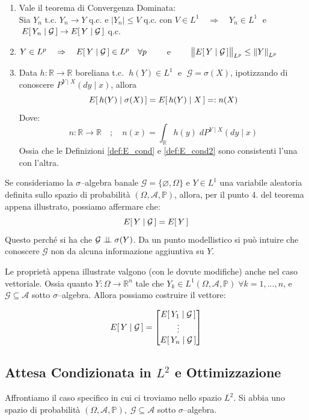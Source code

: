 \begin{teorema}
\begin{enumerate}[start=0]
        \item Vale il teorema di Convergenza Dominata:\\
        Sia $Y_n$ t.c. $Y_n\to Y$ q.c. e $|Y_n|\leq V$ q.c. con $V\in L^1\quad \Rightarrow\quad Y_n\in L^1\;$ e $\; E\!\left[\,Y_n\mid \mathcal{G}\,\right]\to E\!\left[\,Y\mid \mathcal{G}\,\right]$ q.c.

        \item $Y\in L^p \quad \Rightarrow\quad E\!\left[\,Y\mid \mathcal{G}\,\right]\in L^p\quad \forall p\qquad$ e $\qquad \bigl\|E\!\left[\,Y\mid \mathcal{G}\,\right]\bigr\|_{L^p} \leq \left\|Y\right\|_{L^p}$

        \item Data $h:\mathbb{R}\to \mathbb{R}$ boreliana t.c. $\;h(Y)\in L^1\;$ e $\; \mathcal{G} = \sigma(X)$, ipotizzando di conoscere $P^{Y\mid X}(dy\mid x)$, allora
        \[E\!\left[\,h(Y)\mid \sigma(X)\,\right] = E\!\left[\,h(Y)\mid X\,\right] =:n(X)\]
        Dove:
        \[n:\mathbb{R}\to\mathbb{R}\quad ;\quad n(x) = \int_\mathbb{R}h(y)\;dP^{Y\mid X}(dy\mid x)\]
        Ossia che le Definizioni \ref{def:E_cond} e \ref{def:E_cond2} sono consistenti l'una con l'altra.
    \end{enumerate}
\end{teorema}

Se consideriamo la $\sigma$--algebra banale $\mathcal{G} = \{\varnothing, \Omega\}$ e $Y\in L^1$ una variabile aleatoria definita sullo spazio di probabilità $(\Omega, \mathcal{A},\mathbb{P})$, allora, per il punto 4. del teorema appena illustrato, possiamo affermare che:
\[E\!\left[\,Y\mid \mathcal{G}\,\right] = E\!\left[\,Y\,\right]\]
Questo perché si ha che $\mathcal{G}\mathrel{\perp\!\!\!\perp} \sigma(Y)$. Da un punto modellistico si può intuire che conoscere $\mathcal{G}$ non da alcuna informazione aggiuntiva su $Y$.

\bigskip
\noindent Le proprietà appena illustrate valgono (con le dovute modifiche) anche nel caso vettoriale. Ossia quanto $Y:\Omega\to \mathbb{R}^n$ tale che $Y_k\in L^1(\Omega, \mathcal{A},\mathbb{P})\;\forall k = 1, ..., n$, e $\mathcal{G}\subseteq\mathcal{A}$ sotto $\sigma$--algebra. Allora possiamo costruire il vettore:

\[E\!\left[\,Y\mid \mathcal{G}\,\right] = \begin{bmatrix}E\!\left[\,Y_1\mid \mathcal{G}\,\right]\\ \vdots\\ E\!\left[\,Y_n\mid \mathcal{G}\,\right]\end{bmatrix}\]

\subsection{Attesa Condizionata in $L^2$ e Ottimizzazione}
Affrontiamo il caso specifico in cui ci troviamo nello spazio $L^2$. Si abbia uno spazio di probabilità $(\Omega, \mathcal{A},\mathbb{P}), \; \mathcal{G}\subseteq\mathcal{A}$ sotto $\sigma$--algebra.


